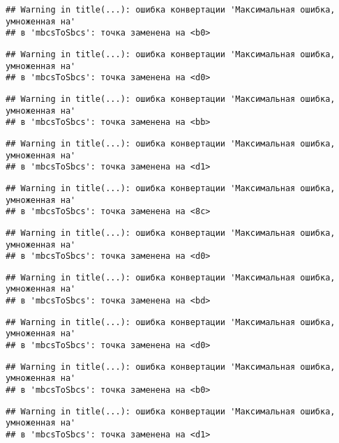 \documentclass[
]{article}
\begin{document}
\begin{verbatim}
## Warning in title(...): ошибка конвертации 'Максимальная ошибка, умноженная на'
## в 'mbcsToSbcs': точка заменена на <b0>
\end{verbatim}

\begin{verbatim}
## Warning in title(...): ошибка конвертации 'Максимальная ошибка, умноженная на'
## в 'mbcsToSbcs': точка заменена на <d0>
\end{verbatim}

\begin{verbatim}
## Warning in title(...): ошибка конвертации 'Максимальная ошибка, умноженная на'
## в 'mbcsToSbcs': точка заменена на <bb>
\end{verbatim}

\begin{verbatim}
## Warning in title(...): ошибка конвертации 'Максимальная ошибка, умноженная на'
## в 'mbcsToSbcs': точка заменена на <d1>
\end{verbatim}

\begin{verbatim}
## Warning in title(...): ошибка конвертации 'Максимальная ошибка, умноженная на'
## в 'mbcsToSbcs': точка заменена на <8c>
\end{verbatim}

\begin{verbatim}
## Warning in title(...): ошибка конвертации 'Максимальная ошибка, умноженная на'
## в 'mbcsToSbcs': точка заменена на <d0>
\end{verbatim}

\begin{verbatim}
## Warning in title(...): ошибка конвертации 'Максимальная ошибка, умноженная на'
## в 'mbcsToSbcs': точка заменена на <bd>
\end{verbatim}

\begin{verbatim}
## Warning in title(...): ошибка конвертации 'Максимальная ошибка, умноженная на'
## в 'mbcsToSbcs': точка заменена на <d0>
\end{verbatim}

\begin{verbatim}
## Warning in title(...): ошибка конвертации 'Максимальная ошибка, умноженная на'
## в 'mbcsToSbcs': точка заменена на <b0>
\end{verbatim}

\begin{verbatim}
## Warning in title(...): ошибка конвертации 'Максимальная ошибка, умноженная на'
## в 'mbcsToSbcs': точка заменена на <d1>
\end{verbatim}
\end{document}
